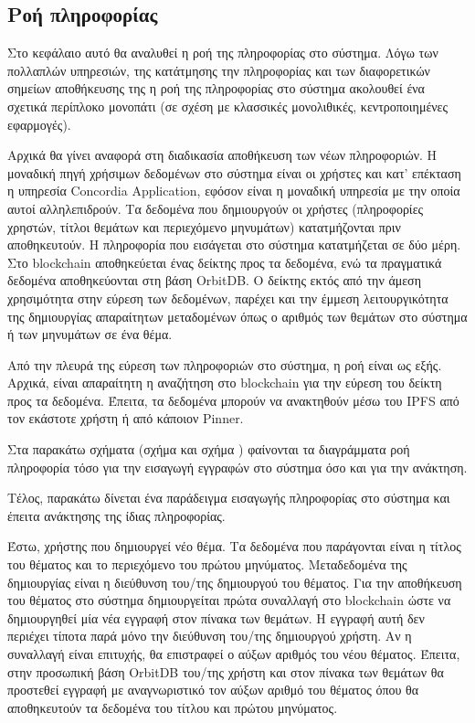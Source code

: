\subsection{Ροή πληροφορίας} \label{subsection:4-4-data-flow}

Στο κεφάλαιο αυτό θα αναλυθεί η ροή της πληροφορίας στο σύστημα. Λόγω των πολλαπλών υπηρεσιών, της κατάτμησης την πληροφορίας και των διαφορετικών σημείων αποθήκευσης της η ροή της πληροφορίας στο σύστημα ακολουθεί ένα σχετικά περίπλοκο μονοπάτι (σε σχέση με κλασσικές μονολιθικές, κεντροποιημένες εφαρμογές).

Αρχικά θα γίνει αναφορά στη διαδικασία αποθήκευση των νέων πληροφοριών. Η μοναδική πηγή χρήσιμων δεδομένων στο σύστημα είναι οι χρήστες και κατ' επέκταση η υπηρεσία Concordia Application, εφόσον είναι η μοναδική υπηρεσία με την οποία αυτοί αλληλεπιδρούν. Τα δεδομένα που δημιουργούν οι χρήστες (πληροφορίες χρηστών, τίτλοι θεμάτων και περιεχόμενο μηνυμάτων) κατατμήζονται πριν αποθηκευτούν. Η πληροφορία που εισάγεται στο σύστημα κατατμήζεται σε δύο μέρη. Στο blockchain αποθηκεύεται ένας δείκτης προς τα δεδομένα, ενώ τα πραγματικά δεδομένα αποθηκεύονται στη βάση OrbitDB. Ο δείκτης εκτός από την άμεση χρησιμότητα στην εύρεση των δεδομένων, παρέχει και την έμμεση λειτουργικότητα της δημιουργίας απαραίτητων μεταδομένων όπως ο αριθμός των θεμάτων στο σύστημα ή των μηνυμάτων σε ένα θέμα.

Από την πλευρά της εύρεση των πληροφοριών στο σύστημα, η ροή είναι ως εξής. Αρχικά, είναι απαραίτητη η αναζήτηση στο blockchain για την εύρεση του δείκτη προς τα δεδομένα. Έπειτα, τα δεδομένα μπορούν να ανακτηθούν μέσω του IPFS από τον εκάστοτε χρήστη ή από κάποιον Pinner.

Στα παρακάτω σχήματα (σχήμα και σχήμα ) φαίνονται τα διαγράμματα ροή πληροφορία τόσο για την εισαγωγή εγγραφών στο σύστημα όσο και για την ανάκτηση.

Τέλος, παρακάτω δίνεται ένα παράδειγμα εισαγωγής πληροφορίας στο σύστημα και έπειτα ανάκτησης της ίδιας πληροφορίας.

Έστω, χρήστης που δημιουργεί νέο θέμα. Τα δεδομένα που παράγονται είναι η τίτλος του θέματος και το περιεχόμενο του πρώτου μηνύματος. Μεταδεδομένα της δημιουργίας είναι η διεύθυνση του/της δημιουργού του θέματος. Για την αποθήκευση του θέματος στο σύστημα δημιουργείται πρώτα συναλλαγή στο blockchain ώστε να δημιουργηθεί μία νέα εγγραφή στον πίνακα των θεμάτων. Η εγγραφή αυτή δεν περιέχει τίποτα παρά μόνο την διεύθυνση του/της δημιουργού χρήστη. Αν η συναλλαγή είναι επιτυχής, θα επιστραφεί ο αύξων αριθμός του νέου θέματος. Έπειτα, στην προσωπική βάση OrbitDB του/της χρήστη και στον πίνακα των θεμάτων θα προστεθεί εγγραφή με αναγνωριστικό τον αύξων αριθμό του θέματος όπου θα αποθηκευτούν τα δεδομένα του τίτλου και πρώτου μηνύματος.

